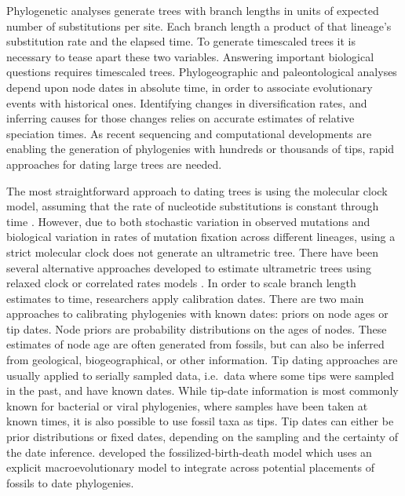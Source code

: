 \documentclass{llncs}
\begin{document}
\vspace{1.5in}

Phylogenetic analyses generate trees with branch lengths in units of expected number of substitutions per site.
Each branch length a product of that lineage's substitution rate and the elapsed time.
To generate time\textendash scaled trees it is necessary to tease apart these two variables.
Answering important biological questions requires time\textendash scaled trees.
Phylogeographic and paleontological analyses depend upon node dates in absolute time,
in order to associate evolutionary events with historical ones.
Identifying changes in diversification rates, and inferring causes for those changes
relies on accurate estimates of relative speciation times.
As recent sequencing and computational developments are enabling the generation of
phylogenies with hundreds or thousands of tips, rapid approaches for dating large trees are needed.

The most straightforward approach to dating trees is using the molecular clock model,
assuming that the rate of nucleotide substitutions is constant through time \citep{zuckerkandl1962}.
However, due to both stochastic variation in observed mutations and 
biological variation in rates of mutation fixation across different lineages,
using a strict molecular clock does not generate an ultrametric tree.
There have been several alternative approaches developed to estimate
ultrametric trees using relaxed clock or correlated rates models \citep{Lepage2007, Thorne1998, Kishino2001}.
In order to scale branch length estimates to time, researchers apply calibration dates. 
There are two main approaches to calibrating phylogenies with known dates:
priors on node ages or tip dates.
Node priors are probability distributions on the ages of nodes.
These estimates of node age are often generated from fossils,
but can also be inferred from geological, biogeographical, or other information.
Tip dating approaches are usually applied to serially sampled data, 
i.e.\ data where some tips were sampled in the past, and have known dates.
While tip-date information is most commonly known for bacterial or viral phylogenies,
where samples have been taken at known times,
it is also possible to use fossil taxa as tips.
Tip dates can either be prior distributions or fixed dates, 
depending on the sampling and the certainty of the date inference.
\citet{Heath2014} developed the fossilized-birth-death model which 
uses an explicit macroevolutionary model to integrate across potential 
placements of fossils to date phylogenies.
\end{document}
